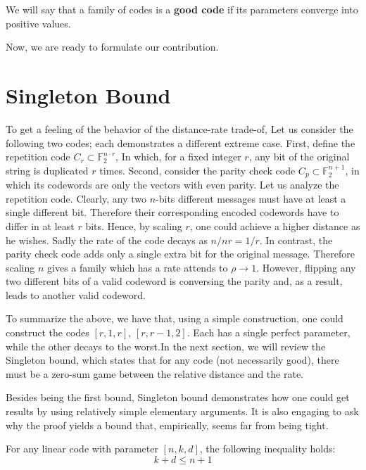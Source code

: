   \begin{definition} \label{good-code} We will say that a family of codes is a \textbf{good code} if its parameters converge into positive values. 
  \end{definition}

  \ifdefined\LDPCLTC
\fi

  
\ifdefined\LDPCLTC
  Now, we are ready to formulate our contribution. 

\fi

  \section{Singleton Bound}  
  To get a feeling of the behavior of the distance-rate trade-of, Let us consider the following two codes; each demonstrates a different extreme case. First, define the repetition code $C_{r} \subset \mathbb{F}_{2}^{n \cdot r}$, In which, for a fixed integer $r$, any bit of the original string is duplicated $r$ times. Second, consider the parity check code $C_{p} \subset \mathbb{F}_{2}^{n+1}$, in which its codewords are only the vectors with even parity. Let us analyze the repetition code. Clearly, any two $n$-bits different messages must have at least a single different bit. Therefore their corresponding encoded codewords have to differ in at least $r$ bits. Hence, by scaling $r$, one could achieve a higher distance as he wishes. Sadly the rate of the code decays as $n/nr = 1/r$. In contrast, the parity check code adds only a single extra bit for the original message. Therefore scaling $n$ gives a family which has a rate attends to $\rho \rightarrow 1$. However, flipping any two different bits of a valid codeword is conversing the parity and, as a result, leads to another valid codeword.

  To summarize the above, we have that, using a simple construction, one could construct the codes $[r, 1, r]$, $[r, r-1, 2]$. Each has a single perfect parameter, while the other decays to the worst.\ifdefined\LDPCLTC In the next section, we will review the Singleton bound, which states that for any code (not necessarily good), there must be a zero-sum game between the relative distance and the rate.
\fi %

  Besides being the first bound, Singleton bound demonstrates how one could get results by using relatively simple elementary arguments. It is also engaging to ask why the proof yields a bound that, empirically, seems far from being tight.
  \begin{theorem*}\label{theorem*:Sing}  For any linear code with parameter $[n,k,d]$, the following inequality holds:
  \begin{equation*}
    k+ d \le n + 1
  \end{equation*} 
  \end{theorem*}

